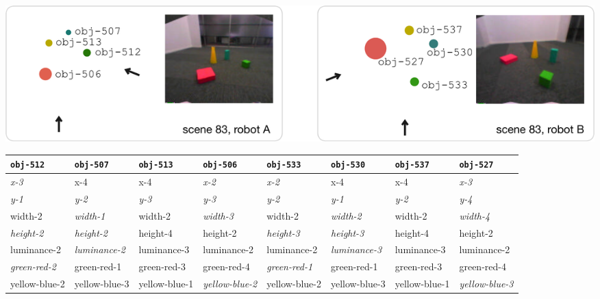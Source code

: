 
\parbox{\textwidth}{
  \renewcommand{\arraystretch}{1.3}
  \includegraphics[width=1\textwidth]{figures/qfwm-example-world-models-scene-83}
  
  \vspace{0.5cm}
  \begin{tabular*}{\textwidth}{@{}p{2.05cm}@{}p{2.05cm}@{}p{2.05cm}@{}p{2.05cm}@{}||p{2.05cm}@{}p{2.05cm}@{}p{2.05cm}@{}p{2.05cm}}
    {\tt obj-512} & {\tt obj-507} & {\tt obj-513} & {\tt obj-506} & {\tt obj-533} & {\tt obj-530} & {\tt obj-537} & {\tt obj-527} \\
    \hline
    \textcolor{dark}{\slshape x-3 } & { x-4 } & { x-4} & \textcolor{dark}{\slshape  x-2} & \textcolor{dark}{\slshape  x-2} & {  x-4} & {  x-4} & \textcolor{dark}{\slshape  x-3} \\
    \textcolor{dark}{\slshape y-1} & \textcolor{dark}{\slshape y-2} & \textcolor{dark}{\slshape y-3} & \textcolor{dark}{\slshape y-3} & \textcolor{dark}{\slshape y-2} & \textcolor{dark}{\slshape y-1} & \textcolor{dark}{\slshape y-2} & \textcolor{dark}{\slshape y-4 }\\
    { width-2} & \textcolor{dark}{\slshape width-1} & { width-2} & \textcolor{dark}{\slshape width-3} & { width-2} & \textcolor{dark}{\slshape width-2} & { width-2} & \textcolor{dark}{\slshape width-4 }\\
    \textcolor{dark}{\slshape height-2} & \textcolor{dark}{\slshape height-2} & { height-4} & { height-2} & \textcolor{dark}{\slshape height-3} & \textcolor{dark}{\slshape height-3} & { height-4} & { height-2 }\\
    { luminance-2} & \textcolor{dark}{\slshape luminance-2} & { luminance-3} & { luminance-2} & { luminance-2} & \textcolor{dark}{\slshape luminance-3} & { luminance-3} & { luminance-2 }\\
    \textcolor{dark}{\slshape green-red-2} & { green-red-1} & { green-red-3} & { green-red-4} & \textcolor{dark}{\slshape green-red-1} & { green-red-1} & { green-red-3} & { green-red-4 }\\
    { yellow-blue-2} & { yellow-blue-3} & { yellow-blue-1} & \textcolor{dark}{\slshape yellow-blue-2} & { yellow-blue-2} & { yellow-blue-3} & { yellow-blue-1} & \textcolor{dark}{\slshape yellow-blue-3}\\
    \hline
    
  \end{tabular*}
  \vspace{0.2cm}}